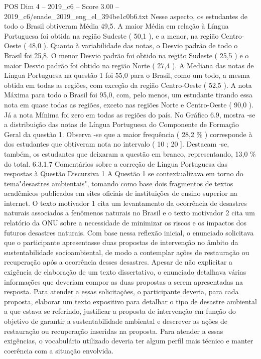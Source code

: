 \begin{textsample}{POS Dim 4 – 2019\_c6 – Score 3.00 – 2019\_c6/enade\_2019\_eng\_el\_394be1c0b6.txt}
Nesse aspecto, os estudantes de todo o Brasil obtiveram Média 49,5.
A maior Média em relação à Língua Portuguesa foi obtida na região Sudeste ( 50,1 ), e a menor, na região Centro-Oeste ( 48,0 ).
Quanto à variabilidade das notas, o Desvio padrão de todo o Brasil foi 25,8.
O menor Desvio padrão foi obtido na região Sudeste ( 25,5 ) e o maior Desvio padrão foi obtido na região Norte ( 27,4 ).
A Mediana das notas de Língua Portuguesa na questão 1 foi 55,0 para o Brasil, como um todo, a mesma obtida em todas as regiões, com exceção da região Centro-Oeste ( 52,5 ).
A nota Máxima para todo o Brasil foi 95,0, com, pelo menos, um estudante tirando essa nota em quase todas as regiões, exceto nas regiões Norte e Centro-Oeste ( 90,0 ).
Já a nota Mínima foi zero em todas as regiões do país.
No Gráfico 6.9, mostra -se a distribuição das notas de Língua Portuguesa do Componente de Formação Geral da questão 1.
Observa -se que a maior frequência ( 28,2 \% ) corresponde à dos estudantes que obtiveram nota no intervalo ( 10 ; 20 ].
Destacam -se, também, os estudantes que deixaram a questão em branco, representando, 13,0 \% do total. 6.3.1.7 Comentários sobre a correção de Língua Portuguesa das respostas à Questão Discursiva 1 A Questão 1 se contextualizava em torno do tema"desastres ambientais", tomando como base dois fragmentos de textos acadêmicos publicados em sites oficiais de instituições de ensino superior na internet.
O texto motivador 1 cita um levantamento da ocorrência de desastres naturais associados a fenômenos naturais no Brasil e o texto motivador 2 cita um relatório da ONU sobre a necessidade de minimizar os riscos e os impactos dos futuros desastres naturais.
Com base nessa reflexão inicial, o enunciado solicitava que o participante apresentasse duas propostas de intervenção no âmbito da sustentabilidade socioambiental, de modo a contemplar ações de restauração ou recuperação após a ocorrência desses desastres.
Apesar de não explicitar a exigência de elaboração de um texto dissertativo, o enunciado detalhava várias informações que deveriam compor as duas propostas a serem apresentadas na resposta.
Para atender a essas solicitações, o participante deveria, para cada proposta, elaborar um texto expositivo para detalhar o tipo de desastre ambiental a que estava se referindo, justificar a proposta de intervenção em função do objetivo de garantir a sustentabilidade ambiental e descrever as ações de restauração ou recuperação inseridas na proposta.
Para atender a essas exigências, o vocabulário utilizado deveria ter algum perfil mais técnico e manter coerência com a situação envolvida.

\end{textsample}
